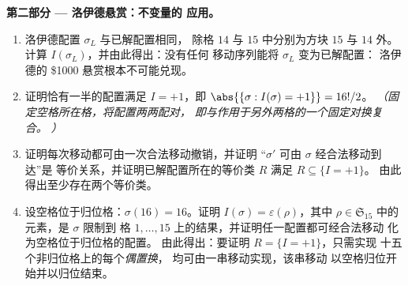 \begin{problem}
\medskip
\noindent\textbf{第二部分 --- 洛伊德悬赏：不变量的
应用。}
\begin{enumerate}[resume]
  \item 洛伊德配置 $\sigma_L$ 与已解配置相同，
        除格 $14$ 与 $15$ 中分别为方块 $15$ 与 $14$ 外。
        计算 $I(\sigma_L)$，并由此得出：没有任何
        移动序列能将 $\sigma_L$ 变为已解配置：
        洛伊德的 \$1000 悬赏根本不可能兑现。
  \item 证明恰有一半的配置满足 $I =
        +1$，即 $\abs{\{\sigma : I(\sigma) = +1\}} = 16!/2$。
        \emph{（固定空格所在格，将配置两两配对，
        即与作用于另外两格的一个固定对换复合。
        ）}
  \item 证明每次移动都可由一次合法移动撤销，并证明
        “$\sigma'$ 可由 $\sigma$ 经合法移动到达”是
        等价关系，并证明已解配置所在的等价类 $R$
        满足 $R \subseteq \{I = +1\}$。
        由此得出至少存在两个等价类。
  \item 设空格位于归位格：$\sigma(16) = 16$。证明
        $I(\sigma) = \varepsilon(\rho)$，其中 $\rho \in
        \mathfrak{S}_{15}$ 中的元素，是 $\sigma$ 限制到
        格 $1, \dots, 15$ 上的结果，并证明任一配置都可经合法移动
        化为空格位于归位格的配置。
        由此得出：要证明 $R = \{I = +1\}$，只需实现
        十五个非归位格上的每个\emph{偶置换}，
        均可由一串移动实现，该串移动
        以空格归位开始并以归位结束。
\end{enumerate}


\end{problem}
